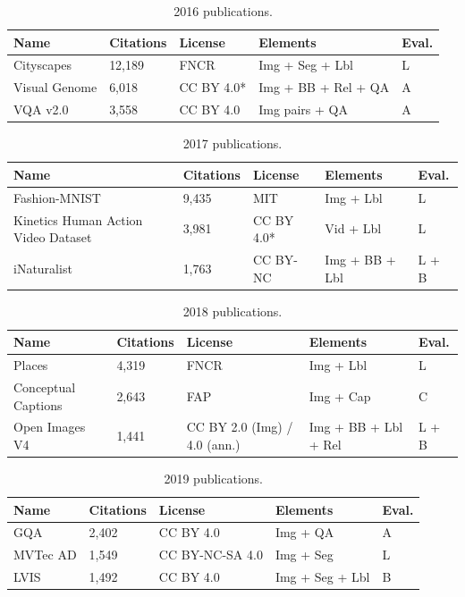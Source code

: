 \documentclass{article}
\begin{document}
\begin{table}[H]
\centering
\caption{2016 publications.}
\begin{tabular}{p{2.5cm}p{1.65cm}p{3.05cm}p{3.2cm}p{2.15cm}}
\hline
\textbf{Name} & \textbf{Citations} & \textbf{License} & \textbf{Elements} & \textbf{Eval.}\\
\hline
Cityscapes & 12,189 & FNCR & Img + Seg + Lbl & L\\
\hline
Visual Genome & 6,018 & CC BY 4.0* & Img + BB + Rel + QA & A\\
\hline
VQA v2.0 & 3,558 & CC BY 4.0 & Img pairs + QA & A\\
\hline

\end{tabular}
\end{table}

\begin{table}[H]
\centering
\caption{2017 publications.}
\begin{tabular}{p{2.5cm}p{1.65cm}p{3.05cm}p{3.2cm}p{2.15cm}}
\hline
\textbf{Name} & \textbf{Citations} & \textbf{License} & \textbf{Elements} & \textbf{Eval.}\\
\hline
Fashion-MNIST & 9,435 & MIT & Img + Lbl & L\\
\hline
Kinetics Human Action Video Dataset & 3,981 & CC BY 4.0* & Vid + Lbl & L\\
\hline
iNaturalist & 1,763 & CC BY-NC & Img + BB + Lbl & L + B\\
\hline

\end{tabular}
\end{table}

\begin{table}[H]
\centering
\caption{2018 publications.}
\begin{tabular}{p{2.5cm}p{1.65cm}p{3.05cm}p{3.2cm}p{2.15cm}}
\hline
\textbf{Name} & \textbf{Citations} & \textbf{License} & \textbf{Elements} & \textbf{Eval.}\\
\hline
Places & 4,319 & FNCR & Img + Lbl & L\\
\hline
Conceptual Captions & 2,643 & FAP & Img + Cap & C\\
\hline
Open Images V4 & 1,441 & CC BY 2.0 (Img) / 4.0 (ann.) & Img + BB + Lbl + Rel & L + B\\
\hline

\end{tabular}
\end{table}

\begin{table}[H]
\centering
\caption{2019 publications.}
\begin{tabular}{p{2.5cm}p{1.65cm}p{3.05cm}p{3.2cm}p{2.15cm}}
\hline
\textbf{Name} & \textbf{Citations} & \textbf{License} & \textbf{Elements} & \textbf{Eval.}\\
\hline
GQA & 2,402 & CC BY 4.0 & Img + QA & A\\
\hline
MVTec AD & 1,549 & CC BY-NC-SA 4.0 & Img + Seg & L\\
\hline
LVIS & 1,492 & CC BY 4.0 & Img + Seg + Lbl & B\\
\hline

\end{tabular}
\end{table}
\end{document}
